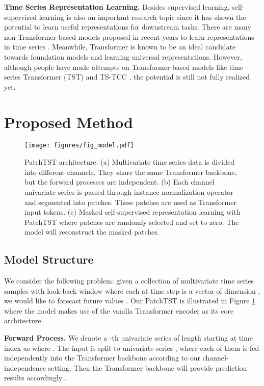\documentclass{article} \usepackage{iclr2023_conference,times}
\begin{document}
\textbf{Time Series Representation Learning.} Besides supervised learning, self-supervised learning is also an important research topic since it has shown the potential to learn useful representations for downstream tasks. There are many non-Transformer-based models proposed in recent years to learn representations in time series \citep{representation,tnc,btsf,ts2vec}. Meanwhile, Transformer is known to be an ideal candidate towards foundation models \citep{foundation} and learning universal representations. However, although people have made attempts on Transformer-based models like time series Transformer (TST) \citep{tst} and TS-TCC \citep{ts-tcc}, the potential is still not fully realized yet.

\section{Proposed Method}

\begin{figure}[t]
\begin{center}
\texttt{[image: figures/fig\_model.pdf]}
\end{center}
\caption{PatchTST architecture. (a) Multivariate time series data is divided into different channels. They share the same Transformer backbone, but the forward processes are independent. (b) Each channel univariate series is passed through instance normalization operator and segmented into patches. These patches are used as Transformer input tokens. (c) Masked self-supervised representation learning with PatchTST where patches are randomly selected and set to zero. The model will reconstruct the masked patches. }
\label{fig::patchTST}
\end{figure}

\subsection{Model Structure}
\label{subsec::multi-channel patch transformer}
We consider the following problem: given a collection of multivariate time series samples with look-back window  where each  at time step  is a vector of dimension , we would like to forecast  future values . Our PatchTST is illustrated in Figure \ref{fig::patchTST} where the model makes use of the vanilla Transformer encoder as its core architecture. 

\textbf{Forward Process.} We denote a -th univariate series of length  starting at time index  as  where . The input  is split to  univariate series , where each of them is fed independently into the Transformer backbone according to our channel-independence setting. Then the Transformer backbone will provide prediction results  accordingly .
\end{document}
